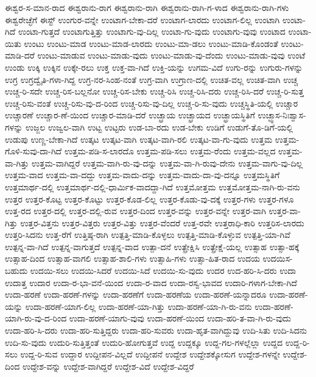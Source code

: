 {ಈಶ್ವರ-ಸ-ಮಾನ-ರಾದ
ಈಶ್ವರಾನು-ರಾಗ
ಈಶ್ವರಾನು-ರಾಗಿ
ಈಶ್ವರಾನು-ರಾಗಿ-ಗ-ಳಾದ
ಈಶ್ವರಾನು-ರಾಗಿ-ಗಳು
ಈಶ್ವರೇಚ್ಛೆಗೆ
ಈಸ್ಟ್
ಉಂಗುರ-ವನ್ನೇ
ಉಂಟಾಗ-ಬೇಕಾ-ದರೆ
ಉಂಟಾಗ-ಲಾರದು
ಉಂಟಾಗ-ಲಿಲ್ಲ
ಉಂಟಾಗಿ
ಉಂಟಾ-ಗಿದೆ
ಉಂಟಾ-ಗುತ್ತದೆ
ಉಂಟಾಗುತ್ತಿತ್ತು
ಉಂಟಾಗು-ವು-ದಿಲ್ಲ
ಉಂಟಾ-ಗು-ವುದು
ಉಂಟಾಗು-ವುವು
ಉಂಟಾದ
ಉಂಟಾ-ಯಿತು
ಉಂಟು
ಉಂಟು-ಮಾಡ
ಉಂಟು-ಮಾಡ-ಲಾರದು
ಉಂಟು-ಮಾ-ಡಲು
ಉಂಟು-ಮಾಡಿ-ಕೊಂಡಂತೆ
ಉಂಟು-ಮಾಡಿ-ದರೆ
ಉಂಟು-ಮಾಡುವ
ಉಂಟು-ಮಾಡು-ವುದು
ಉಂಟು-ಮಾಡು-ವು-ದೆಂದು
ಉಂಟು-ಮಾಡು-ವುವು
ಉಂಟೆ
ಉಂಡು
ಉಕ್ಕಿ
ಉಕ್ಕಿನ
ಉಕ್ಕೇ-ರಲು
ಉಕ್ತ
ಉಕ್ತ-ವಾ-ಗಿದೆ
ಉಕ್ತಿ-ಯನ್ನು
ಉಗಮ-ವಿದೆ
ಉಗು-ರನ್ನು
ಉಗುರು-ಗಳನ್ನು
ಉಗ್ರ
ಉಗ್ರದ್ವೈತಿ-ಗಳಾ-ಗಿದ್ದ
ಉಗ್ರ-ನರ-ಸಿಂಹ-ನಂತೆ
ಉಗ್ರ-ವಾಗಿ
ಉಗ್ರಾಣ-ದಲ್ಲಿ
ಉಚಿತ-ವಲ್ಲ
ಉಚಿತ-ವಾಗಿ
ಉಚ್ಚ
ಉಚ್ಚ-ರಿ-ಸದೇ
ಉಚ್ಚ-ರಿಸ-ಬಲ್ಲನೋ
ಉಚ್ಚ-ರಿಸ-ಬೇಕು
ಉಚ್ಚ-ರಿಸಿ
ಉಚ್ಚ-ರಿಸಿ-ದರು
ಉಚ್ಚ-ರಿಸಿ-ದರೆ
ಉಚ್ಚ-ರಿ-ಸುತ್ತ
ಉಚ್ಚ-ರಿಸು-ವಂತೆ
ಉಚ್ಚ-ರಿಸು-ವು-ದ-ರಿಂದ
ಉಚ್ಚ-ರಿಸು-ವು-ದಿಲ್ಲ
ಉಚ್ಚ-ರಿ-ಸು-ವುದು
ಉಚ್ಚಸ್ಥಿತಿ-ಯಲ್ಲಿ
ಉಚ್ಚಾರ
ಉಚ್ಚಾರಣೆ
ಉಚ್ಚಾರ-ಣೆ-ಯಿಂದ
ಉಚ್ಚಾರ-ಮಾಡಿ-ದರೆ
ಉಚ್ಛ್ರಾಯ
ಉಚ್ಛ್ರಾಯದ
ಉಚ್ಛ್ರಾಯಸ್ಥಿತಿಗೆ
ಉಚ್ಛ್ವಾಸ-ನಿಃಶ್ವಾಸ-ಗಳನ್ನು
ಉಜ್ಜಲ
ಉಜ್ವಲ-ವಾಗಿ
ಉಟ್ಟ
ಉಟ್ಟರು
ಉಡ-ಬಾ-ರದು
ಉಡ-ಬೇಕು
ಉಡಿಗೆ
ಉಡುಗೆ-ತೊ-ಡಿಗೆ-ಯಲ್ಲಿ
ಉಡುಪು
ಉಣ್ಣ-ಬೇಕಾ-ಗಿದೆ
ಉತ್ಕಟ
ಉತ್ಕಟ-ವಾಗಿ
ಉತ್ಕಟ-ವಾಗಿ-ರಲಿ
ಉತ್ಕಟ-ವಾ-ಗು-ವುದು
ಉತ್ತಮ
ಉತ್ತಮ-ಗೊಳಿ-ಸುವು-ದಾ-ಗಿದೆ
ಉತ್ತಮ-ಪಡಿ-ಸ-ಲಾರದೊ
ಉತ್ತಮ-ಪಡಿ-ಸಲು
ಉತ್ತಮ-ರೆಂದು
ಉತ್ತಮ-ವಲ್ಲದ
ಉತ್ತಮ-ವಾ-ಗಿತ್ತು
ಉತ್ತಮ-ವಾಗಿದ್ದರೆ
ಉತ್ತಮ-ವಾಗಿ-ರು-ವು-ದನ್ನು
ಉತ್ತಮ-ವಾ-ಗಿ-ರುವು-ದೇನು
ಉತ್ತಮ-ವಾಗು-ವು-ದಿಲ್ಲ
ಉತ್ತಮ-ವಾದ
ಉತ್ತಮ-ವಾ-ದದ್ದು
ಉತ್ತಮ-ವಾದು-ದನ್ನು
ಉತ್ತಮ-ವಾದು-ದಾ-ವು-ದನ್ನೂ
ಉತ್ತಮಸ್ಥಿತಿಗೆ
ಉತ್ತಮಾರ್ಥ-ದಲ್ಲಿ
ಉತ್ತಮಾರ್ಥ-ದಲ್ಲಿ-ಧಾರ್ಮಿಕ-ವಾದದ್ದಾ-ಗಿದೆ
ಉತ್ತಮೋತ್ತಮ
ಉತ್ತಮೋತ್ತಮ-ನಾಗಿ-ರು-ವನು
ಉತ್ತರ
ಉತ್ತರ-ಕೊಟ್ಟ
ಉತ್ತರ-ಕೊಟ್ಟು
ಉತ್ತರ-ಕೊಡ-ಲಿಲ್ಲ
ಉತ್ತರ-ಕೊಡು-ವು-ದಕ್ಕೆ
ಉತ್ತರ-ಗಳು
ಉತ್ತರ-ಗಳೂ
ಉತ್ತ-ರದ
ಉತ್ತರ-ದಲ್ಲಿ
ಉತ್ತರ-ದಲ್ಲಿ-ರುವ
ಉತ್ತರ-ದಿಂದ
ಉತ್ತರ-ವನ್ನು
ಉತ್ತರ-ವನ್ನೇ
ಉತ್ತರ-ವಾಗಿ
ಉತ್ತರ-ವಾ-ಗಿತ್ತು
ಉತ್ತರ-ವಿತ್ತನು
ಉತ್ತರ-ವಿತ್ತರು
ಉತ್ತರ-ವಿತ್ತು
ಉತ್ತರ-ವೆಂದರೆ
ಉತ್ತ-ರವೇ
ಉತ್ತರಾಧಿ-ಕಾರಿ
ಉತ್ತರಿಸ-ಲಾರದು
ಉತ್ತರಿ-ಸಿದನು
ಉತ್ತ-ರೆಗೆ
ಉತ್ತಿಷ್ಠ-ರಾಗಿ
ಉತ್ಪತ್ತಿ-ಮಾಡಿ-ಕೊಳ್ಳಲು
ಉತ್ಪತ್ತಿ-ಮಾಡಿ-ಕೊಳ್ಳುವ
ಉತ್ಪತ್ತಿ-ಯಾ-ಗಿವೆ
ಉತ್ಪನ್ನ-ವಾ-ಗಿದೆ
ಉತ್ಪನ್ನ-ವಾಗುತ್ತದೆ
ಉತ್ಪನ್ನ-ವಾದ
ಉತ್ಪಾ-ದನೆ
ಉತ್ಪ್ರೇಕ್ಷಿಸಿ
ಉತ್ಪ್ರೇಕ್ಷೆ-ಯಲ್ಲ
ಉತ್ಸಾಹ
ಉತ್ಸಾ-ಹಕ್ಕೆ
ಉತ್ಸಾಹ-ದಿಂದ
ಉತ್ಸಾಹ-ವಾಗಲಿ
ಉತ್ಸಾಹ-ಶಾಲಿ-ಗಳು
ಉತ್ಸಾಹಿ-ಗಳು
ಉತ್ಸಾ-ಹಿತ-ರಾದ
ಉದಯ
ಉದಯಿಸ-ಬಹುದು
ಉದಯಿ-ಸಲು
ಉದಯಿ-ಸಿದರೆ
ಉದಯಿ-ಸಿದೆ
ಉದಯಿ-ಸು-ವುದು
ಉದರ
ಉದ-ಹರಿ-ಸಿ-ದರು
ಉದಾ
ಉದಾತ್ತ
ಉದಾರ
ಉದಾ-ರ-ಭಾ-ವನೆ-ಯಿಂದ
ಉದಾ-ರ-ವಾದ
ಉದಾ-ರಸ್ವ-ಭಾವದ
ಉದಾರಿ-ಗಳಾಗ-ಬೇಕಾ-ಗಿದೆ
ಉದಾ-ಹರಣೆ
ಉದಾ-ಹರಣೆ-ಗಳನ್ನು
ಉದಾ-ಹರಣೆಗೆ
ಉದಾ-ಹರಣೆಯ
ಉದಾ-ಹರಣೆ-ಯನ್ನಾದರೂ
ಉದಾ-ಹರಣೆ-ಯನ್ನು
ಉದಾ-ಹರಣೆ-ಯಾಗ-ಲಿಲ್ಲ
ಉದಾ-ಹರಣೆ-ಯಾ-ಗಿತ್ತು
ಉದಾ-ಹರಣೆ-ಯಾ-ಗಿ-ರು-ವನು
ಉದಾ-ಹರಣೆ-ಯಾಗಿ-ರು-ವು-ದ-ರಿಂದ
ಉದಾ-ಹರಣೆ-ಯಾಗು-ವುವು
ಉದಾ-ಹರಣೆ-ಯಿಂದ
ಉದಾ-ಹರಿ-ತ-ವಾ-ಗಿ-ರು-ವುದು
ಉದಾ-ಹರಿ-ಸಿ-ದರು
ಉದಾ-ಹರಿ-ಸುತ್ತಿದ್ದರು
ಉದಾ-ಹರಿ-ಸುವರು
ಉದಾ-ಹೃತ-ವಾಗಿದ್ದುವು
ಉದಿ-ಸಿತು
ಉದಿ-ಸಿದನು
ಉದಿ-ಸು-ವುದು
ಉದುರಿ-ಸುತ್ತಿತ್ತಂತೆ
ಉದುರಿ-ಹೋಗುತ್ತವೆ
ಉದ್ದ
ಉದ್ದಕ್ಕೂ
ಉದ್ದ-ಗಲ-ಗಳಲ್ಲೆಲ್ಲಾ
ಉದ್ದದ
ಉದ್ದ-ರಿ-ಸಲು
ಉದ್ದ-ರಿ-ಸುವ
ಉದ್ದಾರ
ಉದ್ದೀಪನ-ವಿಲ್ಲದೆ
ಉದ್ದೀಪನೆ
ಉದ್ದೇಶ
ಉದ್ದೇಶಕ್ಕೋಸುಗ
ಉದ್ದೇಶ-ಗಳನ್ನೇ
ಉದ್ದೇಶ-ದಿಂದ
ಉದ್ದೇಶ-ವನ್ನು
ಉದ್ದೇಶ-ವಾಗಿದ್ದರೆ
ಉದ್ದೇಶ-ವಿದೆ
ಉದ್ದೇಶ-ವಿದ್ದರೆ
}
